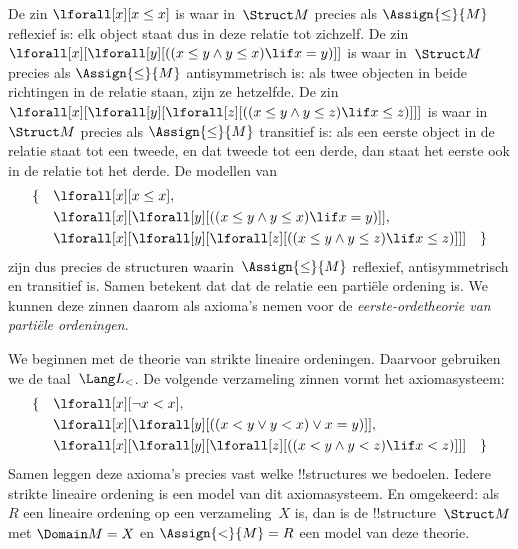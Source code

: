 \documentclass[openany]{memoir}
\begin{document}
\begin{ex}
De zin $\lforall[x][x \le x]$ is waar in~$\Struct M$ precies als
$\Assign{\le}{M}$ reflexief is: elk object staat dus in deze relatie
tot zichzelf. De zin
$\lforall[x][\lforall[y][((x \le y \land y \le x) \lif x = y)]]$ is
waar in~$\Struct M$ precies als $\Assign{\le}{M}$ antisymmetrisch is:
als twee objecten in beide richtingen in de relatie staan, zijn ze
hetzelfde. De zin
$\lforall[x][\lforall[y][\lforall[z][((x \le y \land y \le z)
      \lif x \le z)]]]$ is waar in~$\Struct M$ precies als
$\Assign{\le}{M}$ transitief is: als een eerste object in de relatie
staat tot een tweede, en dat tweede tot een derde, dan staat het eerste
ook in de relatie tot het derde. De modellen van
\begin{align*}
\{\quad &\lforall[x][x \le x], \\
   & \lforall[x][\lforall[y][((x \le y \land y \le
    x) \lif x = y)]], \\
   &\lforall[x][\lforall[y][\lforall[z][((x \le y
      \land y \le z) \lif x \le z)]]] \quad \}
\end{align*}
zijn dus precies de structuren waarin~$\Assign{\le}{M}$ reflexief,
antisymmetrisch en transitief is. Samen betekent dat dat de relatie een
partiële ordening is. We kunnen deze zinnen daarom als axioma's nemen
voor de \emph{eerste-ordetheorie van partiële ordeningen}.
\end{ex}
\endgroup

\begingroup
\def\olfilename{OLP-0170}
\def\olfilepath{content/first-order-logic/models-theories/}
\hypertarget{unit-OLP-0170}{}





\begin{ex}
We beginnen met de theorie van strikte lineaire ordeningen. Daarvoor
gebruiken we de taal~$\Lang L_<$. De volgende verzameling zinnen vormt
het axiomasysteem:
\begin{align*}
\{\quad & \lforall[x][\lnot x < x], \\
& \lforall[x][\lforall[y][((x < y \lor y <
    x) \lor x = y)]], \\
& \lforall[x][\lforall[y][\lforall[z][((x < y
      \land y < z) \lif x < z)]]] \quad \}
\end{align*}
Samen leggen deze axioma's precies vast welke !!{structure}s we
bedoelen. Iedere strikte lineaire ordening is een model van dit
axiomasysteem. En omgekeerd: als $R$ een lineaire ordening op een
verzameling~$X$ is, dan is de !!{structure}~$\Struct M$ met
$\Domain M = X$ en $\Assign{<}{M} = R$ een model van deze theorie.
\end{ex}
\end{document}
